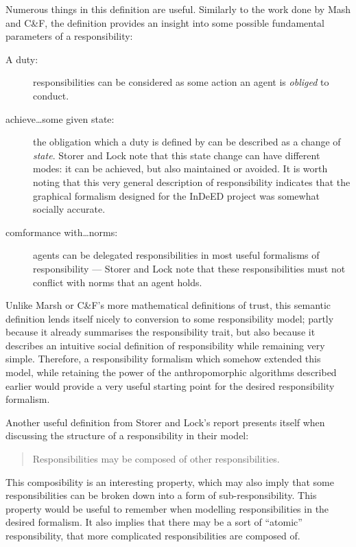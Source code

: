 Numerous things in this definition are useful. Similarly to the work done by Mash and C\&F, the definition provides an insight into some possible fundamental parameters of a responsibility:

\begin{description}%
    \item [A duty: ] responsibilities can be considered as some action an agent is \emph{obliged} to conduct.
    \item [achieve\ldots{}some given state: ] the obligation which a duty is defined by can be described as a change of \emph{state}. Storer and Lock note that this state change can have different modes: it can be achieved, but also maintained or avoided. It is worth noting that this very general description of responsibility indicates that the graphical formalism designed for the InDeED project was somewhat socially accurate.
    \item [comformance with\ldots{}norms: ] agents can be delegated responsibilities in most useful formalisms of responsibility --- Storer and Lock note that these responsibilities must not conflict with norms that an agent holds.
\end{description}

Unlike Marsh or C\&F's more mathematical definitions of trust, this semantic definition lends itself nicely to conversion to some responsibility model; partly because it already summarises the responsibility trait, but also because it describes an intuitive social definition of responsibility while remaining very simple. Therefore, a responsibility formalism which somehow extended this model, while retaining the power of the anthropomorphic algorithms described earlier would provide a very useful starting point for the desired responsibility formalism.\par

Another useful definition from Storer and Lock's report presents itself when discussing the structure of a responsibility in their model:

\begin{quotation}
    Responsibilities may be composed of other responsibilities.
\end{quotation}

This composibility is an interesting property, which may also imply that some responsibilities can be broken down into a form of sub-responsibility. This property would be useful to remember when modelling responsibilities in the desired formalism. It also implies that there may be a sort of ``atomic'' responsibility, that more complicated responsibilities are composed of.

